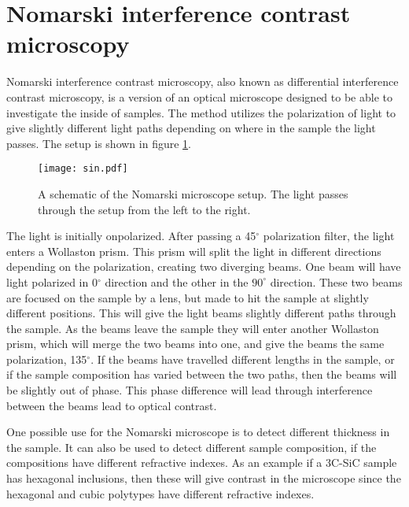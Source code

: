 
	
\section{Nomarski interference contrast microscopy}
\label{sec:nomarski}

Nomarski interference contrast microscopy, also known as differential interference contrast microscopy, is a version of an optical microscope designed to be able to investigate the inside of samples. The method utilizes the polarization of light to give slightly different light paths depending on where in the sample the light passes. The setup is shown in figure \ref{fig:nomarski}.

\begin{figure}[h]
\begin{center}
\texttt{[image: sin.pdf]}
\caption{A schematic of the Nomarski microscope setup. The light passes through the setup from the left to the right. 
\label{fig:nomarski}}
\end{center}
\end{figure}

The light is initially onpolarized. After passing a 45$^\circ$ polarization filter, the light enters a Wollaston prism. This prism will split the light in different directions depending on the polarization, creating two diverging beams. One beam will have light polarized in 0$^\circ$ direction and the other in the $90^\circ$ direction. These two beams are focused on the sample by a lens, but made to hit the sample at slightly different positions. This will give the light beams slightly different paths through the sample. As the beams leave the sample they will enter another Wollaston prism, which will merge the two beams into one, and give the beams the same polarization, 135$^\circ$. If the beams have travelled different lengths in the sample, or if the sample composition has varied between the two paths, then the beams will be slightly out of phase. This phase difference will lead through interference between the beams lead to optical contrast.

One possible use for the Nomarski microscope is to detect different thickness in the sample. It can also be used to detect different sample composition, if the compositions have different refractive indexes. As an example if a 3C-SiC sample has hexagonal inclusions, then these will give contrast in the microscope since the hexagonal and cubic polytypes have different refractive indexes. 





